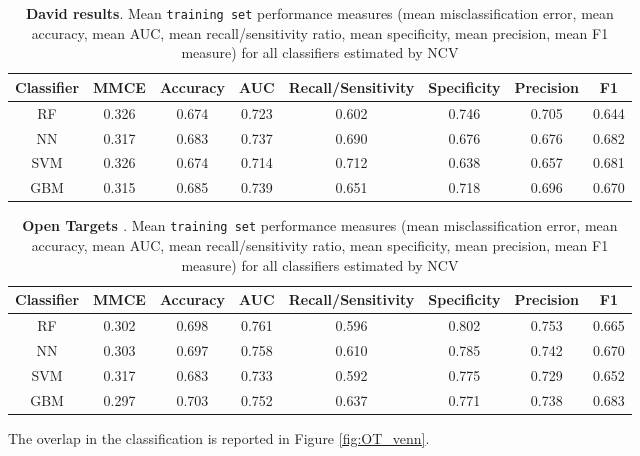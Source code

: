 \begin{table}[H]
\centering
\begin{tabular}{c|c|c|c|c|c|c|c}
Classifier & MMCE  & Accuracy   & AUC   & Recall/Sensitivity   & Specificity   & Precision   & F1    \\
\hline
RF & 0.326 & 0.674 & 0.723 & 0.602 & 0.746 & 0.705 & 0.644 \\
NN & 0.317 & 0.683 & 0.737 & 0.690 & 0.676 & 0.676 & 0.682 \\
SVM & 0.326 & 0.674 & 0.714 & 0.712 & 0.638 & 0.657 & 0.681 \\
GBM & 0.315 & 0.685 & 0.739 & 0.651 & 0.718 & 0.696 & 0.670
\end{tabular}
\caption{\textbf{David results}. Mean \texttt{training set} performance measures (mean misclassification error, mean accuracy, mean AUC, mean recall/sensitivity ratio, mean specificity, mean precision, mean F1 measure) for all classifiers estimated by NCV \label{tab:David_perf_train_mean}}
\end{table}

\begin{table}[H]
\centering
\begin{tabular}{c|c|c|c|c|c|c|c}
Classifier & MMCE  & Accuracy   & AUC   & Recall/Sensitivity   & Specificity   & Precision   & F1    \\
\hline
RF         & 0.302 & 0.698 & 0.761 & 0.596 & 0.802 & 0.753 & 0.665 \\
NN         & 0.303 & 0.697 & 0.758 & 0.610 & 0.785 & 0.742 & 0.670 \\
SVM        & 0.317 & 0.683 & 0.733 & 0.592 & 0.775 & 0.729 & 0.652 \\
GBM        & 0.297 & 0.703 & 0.752 & 0.637 & 0.771 & 0.738 & 0.683
\end{tabular}
\caption{\textbf{Open Targets \cite{ferrero2017}}. Mean \texttt{training set} performance measures (mean misclassification error, mean accuracy, mean AUC, mean recall/sensitivity ratio, mean specificity, mean precision, mean F1 measure) for all classifiers estimated by NCV \label{tab:OT_perf_train_mean}}
\end{table}

The overlap in the classification is reported in Figure \ref{fig:OT_venn}.

